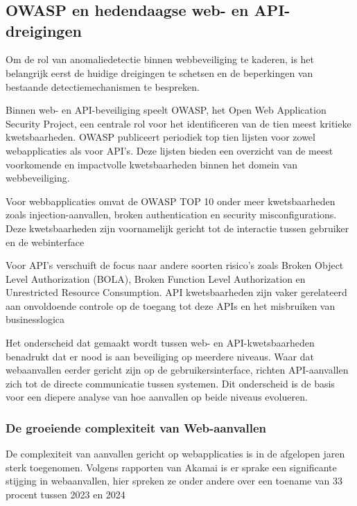 \chapter{}%
\label{ch:stand-van-zaken}

\section{OWASP en hedendaagse web- en API-dreigingen}
\label{sec:api-security-context}
Om de rol van anomaliedetectie binnen webbeveiliging te kaderen, is het belangrijk eerst de huidige dreigingen te schetsen en de beperkingen van bestaande detectiemechanismen te bespreken. 

Binnen web- en API-beveiliging speelt OWASP, het Open Web Application Security Project, een centrale rol voor het identificeren van de tien meest kritieke kwetsbaarheden. OWASP publiceert periodiek top tien lijsten voor zowel webapplicaties als voor API's\autocite{OWASP2026,OWASP2023}. Deze lijsten bieden een overzicht van de meest voorkomende en impactvolle kwetsbaarheden binnen het domein van webbeveiliging.%

Voor webbapplicaties omvat de OWASP TOP 10 onder meer kwetsbaarheden zoals injection-aanvallen, broken authentication en security misconfigurations. Deze kwetsbaarheden zijn voornamelijk gericht tot de interactie tussen gebruiker en de webinterface\autocite{OWASP2026}%

Voor API's verschuift de focus naar andere soorten risico's zoals Broken Object Level Authorization (BOLA), Broken Function Level Authorization en Unrestricted Resource Consumption. API kwetsbaarheden zijn vaker gerelateerd aan onvoldoende controle op de toegang tot deze APIs en het misbruiken van businesslogica\autocite{OWASP2023}%

Het onderscheid dat gemaakt wordt tussen web- en API-kwetsbaarheden benadrukt dat er nood is aan beveiliging op meerdere niveaus. Waar dat webaanvallen eerder gericht zijn op de gebruikersinterface, richten API-aanvallen zich tot de directe communicatie tussen systemen. Dit onderscheid is de basis voor een diepere analyse van hoe aanvallen op beide niveaus evolueren. 

\subsection{De groeiende complexiteit van Web-aanvallen}
\label{subsec:api-aanvallen-complexiteit}
De complexiteit van aanvallen gericht op webapplicaties is in de afgelopen jaren sterk toegenomen. Volgens rapporten van Akamai is er sprake een significante stijging in webaanvallen, hier spreken ze onder andere over een toename van 33 procent tussen 2023 en 2024\autocite{Akamai2025}%

